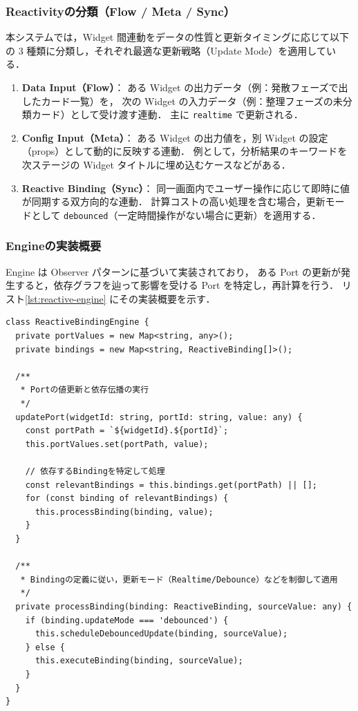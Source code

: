 \documentclass[a4paper,10pt]{jarticle}
\begin{document}
\subsubsection{Reactivityの分類（Flow / Meta / Sync）}
本システムでは，Widget 間連動をデータの性質と更新タイミングに応じて以下の 3 種類に分類し，それぞれ最適な更新戦略（Update Mode）を適用している．

\begin{enumerate}
  \item \textbf{Data Input（Flow）}：
        ある Widget の出力データ（例：発散フェーズで出したカード一覧）を，
        次の Widget の入力データ（例：整理フェーズの未分類カード）として受け渡す連動．
        主に \texttt{realtime} で更新される．
  \item \textbf{Config Input（Meta）}：
        ある Widget の出力値を，別 Widget の設定（props）として動的に反映する連動．
        例として，分析結果のキーワードを次ステージの Widget タイトルに埋め込むケースなどがある．
  \item \textbf{Reactive Binding（Sync）}：
        同一画面内でユーザー操作に応じて即時に値が同期する双方向的な連動．
        計算コストの高い処理を含む場合，更新モードとして \texttt{debounced}（一定時間操作がない場合に更新）を適用する．
\end{enumerate}

\subsubsection{Engineの実装概要}
Engine は Observer パターンに基づいて実装されており，
ある Port の更新が発生すると，依存グラフを辿って影響を受ける Port を特定し，再計算を行う．
リスト\ref{lst:reactive-engine} にその実装概要を示す．

\begin{lstlisting}[caption = ReactiveBindingEngineの実装概要（TypeScript）, label = lst:reactive-engine]
class ReactiveBindingEngine {
  private portValues = new Map<string, any>();
  private bindings = new Map<string, ReactiveBinding[]>();

  /**
   * Portの値更新と依存伝播の実行
   */
  updatePort(widgetId: string, portId: string, value: any) {
    const portPath = `${widgetId}.${portId}`;
    this.portValues.set(portPath, value);

    // 依存するBindingを特定して処理
    const relevantBindings = this.bindings.get(portPath) || [];
    for (const binding of relevantBindings) {
      this.processBinding(binding, value);
    }
  }

  /**
   * Bindingの定義に従い，更新モード（Realtime/Debounce）などを制御して適用
   */
  private processBinding(binding: ReactiveBinding, sourceValue: any) {
    if (binding.updateMode === 'debounced') {
      this.scheduleDebouncedUpdate(binding, sourceValue);
    } else {
      this.executeBinding(binding, sourceValue);
    }
  }
}
\end{lstlisting}
\end{document}
